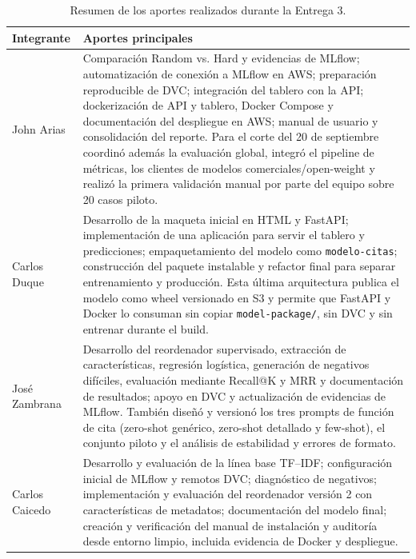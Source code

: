 \documentclass[9pt]{article}
\begin{document}
\begin{table}[H]
\centering
\scriptsize

\begin{tabular}{p{2.5cm}p{10.6cm}}
\toprule
\textbf{Integrante} & \textbf{Aportes principales} \\
\midrule

John Arias &
Comparación Random vs. Hard y evidencias de MLflow; automatización de conexión
a MLflow en AWS; preparación reproducible de DVC; integración del tablero con
la API; dockerización de API y tablero, Docker Compose y documentación del
despliegue en AWS; manual de usuario y consolidación del reporte. Para el corte
del 20 de septiembre coordinó además la evaluación global, integró el pipeline
de métricas, los clientes de modelos comerciales/open-weight y realizó la
primera validación manual por parte del equipo sobre 20 casos piloto. \\

Carlos Duque &
Desarrollo de la maqueta inicial en HTML y FastAPI; implementación de una
aplicación para servir el tablero y predicciones; empaquetamiento del modelo
como \texttt{modelo-citas}; construcción del paquete instalable y refactor
final para separar entrenamiento y producción. Esta última arquitectura
publica el modelo como wheel versionado en S3 y permite que FastAPI y Docker lo
consuman sin copiar \texttt{model-package/}, sin DVC y sin entrenar durante el
build. \\

José Zambrana &
Desarrollo del reordenador supervisado, extracción de características,
regresión logística, generación de negativos difíciles, evaluación mediante
Recall@K y MRR y documentación de resultados; apoyo en DVC y actualización de
evidencias de MLflow. También diseñó y versionó los tres prompts de función de
cita (zero-shot genérico, zero-shot detallado y few-shot), el conjunto piloto y
el análisis de estabilidad y errores de formato. \\

Carlos Caicedo &
Desarrollo y evaluación de la línea base TF--IDF; configuración inicial de
MLflow y remotos DVC; diagnóstico de negativos; implementación y evaluación del
reordenador versión 2 con características de metadatos; documentación del
modelo final; creación y verificación del manual de instalación y auditoría
desde entorno limpio, incluida evidencia de Docker y despliegue. \\

\bottomrule
\end{tabular}

\caption{Resumen de los aportes realizados durante la Entrega 3.}
\end{table}
\end{document}
